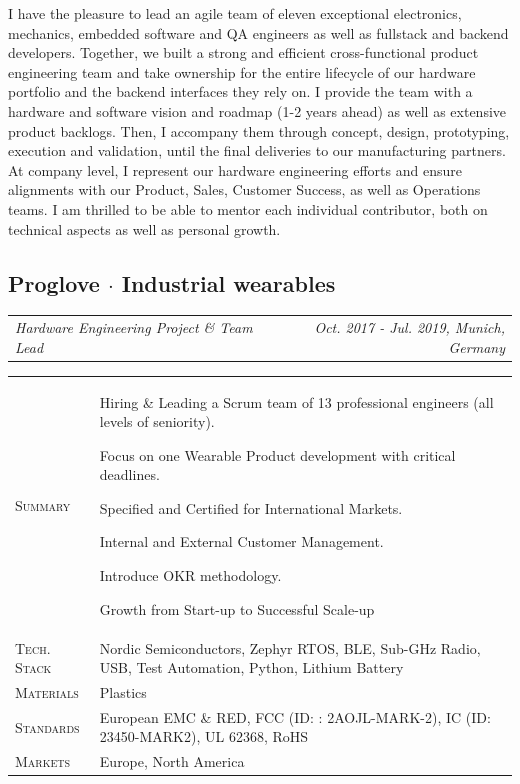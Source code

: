 \documentclass[10pt,a4paper]{moderncv}
\newcommand*{\makecareersubsection}[5]{
    \subsection{#1 {\color{color2}$\cdot$ #2}}
    \addvspace{-0.5em}
    {\color{color2}
    \begin{tabularx}{\textwidth}{LR}
        {\itshape #3} & {\itshape #4, #5}
    \end{tabularx}}
    \par\addvspace{1em}
    }
\begin{document}
    \vspace{1.5em}

    I have the pleasure to lead an agile team of eleven exceptional electronics, mechanics, embedded software and QA engineers as well as fullstack and backend developers. Together, we built a strong and efficient cross-functional product engineering team and take ownership for the entire lifecycle of our hardware portfolio and the backend interfaces they rely on. I provide the team with a hardware and software vision and roadmap (1-2 years ahead) as well as extensive product backlogs. Then, I accompany them through concept, design, prototyping, execution and validation, until the final deliveries to our manufacturing partners. At company level, I represent our hardware engineering efforts and ensure alignments with our Product, Sales, Customer Success, as well as Operations teams. I am thrilled to be able to mentor each individual contributor, both on technical aspects as well as personal growth.

\vspace{0.75em}

\makecareersubsection{Proglove}{Industrial wearables}{Hardware Engineering Project \& Team Lead}{Oct. 2017 - Jul. 2019}{Munich, Germany}

    \begin{tabularx}{\textwidth}{>{\scshape}l@{\hskip 3.5mm}L}
        Summary & Hiring \& Leading a Scrum team of 13 professional engineers (all levels of seniority).
        \par Focus on one Wearable Product development with critical deadlines.
        \par Specified and Certified for International Markets.
        \par Internal and External Customer Management. 
        \par Introduce OKR methodology.
        \par Growth from Start-up to Successful Scale-up\\
        Tech. Stack & Nordic Semiconductors, Zephyr RTOS, BLE, Sub-GHz Radio, USB, Test Automation, Python, Lithium Battery\\
        Materials & Plastics\\
        Standards & European EMC \& RED, FCC (ID: : 2AOJL-MARK-2), IC (ID: 23450-MARK2), UL 62368, RoHS\\
        Markets & Europe, North America\\
    \end{tabularx}
\end{document}
